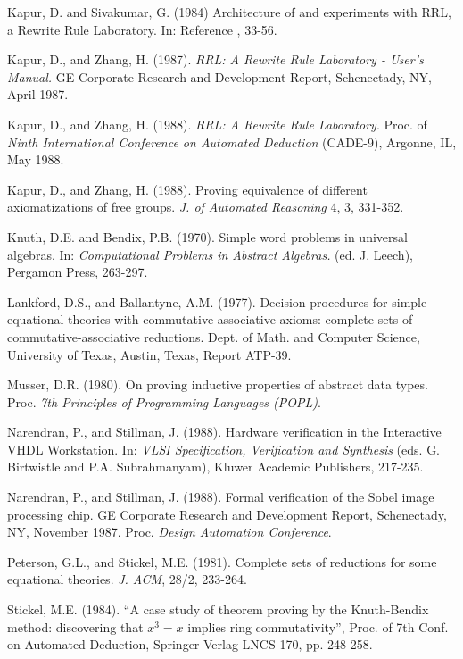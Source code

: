 \begin{thebibliography}{99}
Kapur, D. and Sivakumar, G. (1984) Architecture of
and experiments with RRL, a Rewrite Rule Laboratory. In: Reference
\cite{Guttagetal84}, 33-56.

 Kapur, D., and Zhang, H. (1987). {\it RRL: A Rewrite Rule Laboratory -
User's Manual.} GE Corporate Research and Development Report,
Schenectady, NY, April 1987.

 Kapur, D., and Zhang, H. (1988).
{\sl RRL: A Rewrite Rule Laboratory}.  Proc. of {\it Ninth
International Conference on Automated Deduction} (CADE-9), Argonne,
IL, May 1988.

 Kapur, D., and Zhang, H. (1988). Proving equivalence of 
different axiomatizations of free groups.  {\it J. of Automated
Reasoning} 4, 3, 331-352.

Knuth, D.E. and Bendix, P.B. (1970). Simple word
problems in universal algebras.  In: {\sl Computational Problems in
Abstract Algebras.} (ed. J.  Leech), Pergamon Press, 263-297.

Lankford, D.S., and Ballantyne, A.M.
(1977). Decision procedures for simple equational theories with
commutative-associative axioms: complete sets of
commutative-associative reductions.
Dept. of Math. and Computer Science, University of Texas, Austin,
Texas, Report ATP-39.

Musser, D.R. (1980). On proving inductive
properties of abstract data types. Proc. {\sl 7th Principles of
Programming Languages (POPL)}.

 Narendran, P., and Stillman, J. (1988). Hardware verification in the 
Interactive VHDL Workstation. In: {\sl VLSI Specification,
Verification and Synthesis } (eds. G. Birtwistle and P.A.
Subrahmanyam), Kluwer Academic Publishers, 217-235.

 Narendran, P., and Stillman, J. (1988).
Formal verification of the Sobel image processing chip.  GE Corporate
Research and Development Report, Schenectady, NY, November 1987. Proc.
{\sl Design Automation Conference}.

Peterson, G.L., and Stickel, M.E. (1981).
Complete sets of reductions for some equational theories. {\sl J.
ACM}, 28/2, 233-264.

Stickel, M.E. (1984). ``A case study of theorem proving by the
Knuth-Bendix method: discovering that $x^3 = x$ implies ring
commutativity'', Proc. of 7th Conf. on Automated Deduction,
Springer-Verlag LNCS 170, pp. 248-258.


\end{thebibliography}
